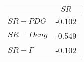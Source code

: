 \begin{tabular}{l|c}
\toprule
{} &   $SR$ \\
\midrule
\textbf{$SR-PDG$   } & -0.102 \\
\textbf{$SR-Deng$  } & -0.549 \\
\textbf{$SR-\Gamma$} & -0.102 \\
\bottomrule
\end{tabular}
